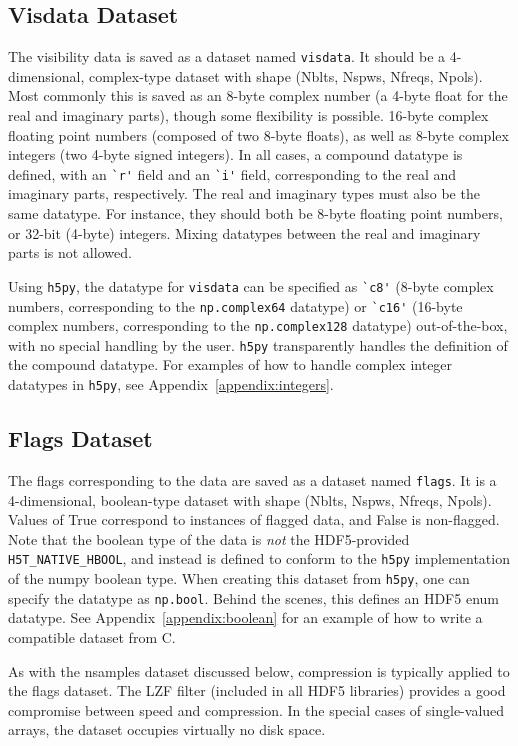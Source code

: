 \documentclass[11pt, oneside]{article}
\begin{document}
\subsection{Visdata Dataset}
\label{sec:visdata}
The visibility data is saved as a dataset named \verb+visdata+. It should be a
4-dimensional, complex-type dataset with shape (Nblts, Nspws, Nfreqs,
Npols). Most commonly this is saved as an 8-byte complex number (a 4-byte float
for the real and imaginary parts), though some flexibility is possible. 16-byte
complex floating point numbers (composed of two 8-byte floats), as well as
8-byte complex integers (two 4-byte signed integers). In all cases, a compound
datatype is defined, with an \verb+`r'+ field and an \verb+`i'+ field,
corresponding to the real and imaginary parts, respectively. The real and
imaginary types must also be the same datatype. For instance, they should both
be 8-byte floating point numbers, or 32-bit (4-byte) integers. Mixing datatypes
between the real and imaginary parts is not allowed.

Using \verb+h5py+, the datatype for \verb+visdata+ can be specified as
\verb+`c8'+ (8-byte complex numbers, corresponding to the \verb+np.complex64+
datatype) or \verb+`c16'+ (16-byte complex numbers, corresponding to the
\verb+np.complex128+ datatype) out-of-the-box, with no special handling by the
user. \verb+h5py+ transparently handles the definition of the compound
datatype. For examples of how to handle complex integer datatypes in
\verb+h5py+, see Appendix~\ref{appendix:integers}.


\subsection{Flags Dataset}
\label{sec:flags}
The flags corresponding to the data are saved as a dataset named
\verb+flags+. It is a 4-dimensional, boolean-type dataset with shape (Nblts,
Nspws, Nfreqs, Npols). Values of True correspond to instances of flagged data,
and False is non-flagged. Note that the boolean type of the data is \textit{not}
the HDF5-provided \verb+H5T_NATIVE_HBOOL+, and instead is defined to conform to
the \verb+h5py+ implementation of the numpy boolean type. When creating this
dataset from \verb+h5py+, one can specify the datatype as \verb+np.bool+. Behind
the scenes, this defines an HDF5 enum datatype. See
Appendix~\ref{appendix:boolean} for an example of how to write a compatible
dataset from C.

As with the nsamples dataset discussed below, compression is typically applied
to the flags dataset. The LZF filter (included in all HDF5 libraries) provides a
good compromise between speed and compression. In the special cases of
single-valued arrays, the dataset occupies virtually no disk space.
\end{document}
